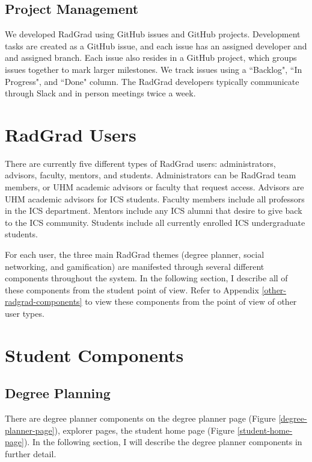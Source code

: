 \subsection{Project Management}

We developed RadGrad using GitHub issues and GitHub projects. Development tasks are created as a GitHub issue, and each issue has an assigned developer and and assigned branch. Each issue also resides in a GitHub project, which groups issues together to mark larger milestones. We track issues using a ``Backlog", ``In Progress", and ``Done" column. The RadGrad developers typically communicate through Slack and in person meetings twice a week. 

\section{RadGrad Users}

There are currently five different types of RadGrad users: administrators, advisors, faculty, mentors, and students. Administrators can be RadGrad team members, or UHM academic advisors or faculty that request access. Advisors are UHM academic advisors for ICS students. Faculty members include all professors in the ICS department. Mentors include any ICS alumni that desire to give back to the ICS community. Students include all currently enrolled ICS undergraduate students. 

For each user, the three main RadGrad themes (degree planner, social networking, and gamification) are manifested through several different components throughout the system. In the following section, I describe all of these components from the student point of view. Refer to Appendix \ref{other-radgrad-components} to view these components from the point of view of other user types.

\section{Student Components}

\subsection{Degree Planning}

There are degree planner components on the degree planner page (Figure \ref{degree-planner-page}), explorer pages, the student home page (Figure \ref{student-home-page}). In the following section, I will describe the degree planner components in further detail. 

